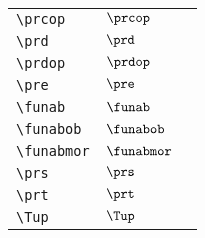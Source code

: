 \begin{longtable}{lll}
 {\color[rgb]{0.5,0.5,0.5}\texttt{\textbackslash prcop}} & $\prcop$ & \\ 
 {\color[rgb]{0.5,0.5,0.5}\texttt{\textbackslash prd}} & $\prd$ & \\ 
 {\color[rgb]{0.5,0.5,0.5}\texttt{\textbackslash prdop}} & $\prdop$ & \\ 
 {\color[rgb]{0.5,0.5,0.5}\texttt{\textbackslash pre}} & $\pre$ & \\ 
 {\color[rgb]{0.5,0.5,0.5}\texttt{\textbackslash funab}} & $\funab$ & \\ 
 {\color[rgb]{0.5,0.5,0.5}\texttt{\textbackslash funabob}} & $\funabob$ & \\ 
 {\color[rgb]{0.5,0.5,0.5}\texttt{\textbackslash funabmor}} & $\funabmor$ & \\ 
 {\color[rgb]{0.5,0.5,0.5}\texttt{\textbackslash prs}} & $\prs$ & \\ 
 {\color[rgb]{0.5,0.5,0.5}\texttt{\textbackslash prt}} & $\prt$ & \\ 
 {\color[rgb]{0.5,0.5,0.5}\texttt{\textbackslash Tup}} & $\Tup$ & \\ 
 \end{longtable}
